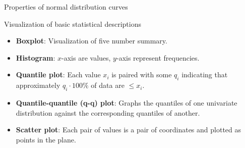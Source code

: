 \documentclass[aspectratio=169,t]{beamer}
\begin{document}
{\begin{frame}{Properties of normal distribution curves}
\begin{tikzpicture}
    \end{tikzpicture}
    \hspace{0.2cm}
    \hspace{0.2cm}
    \end{frame}
  }

{
  \begin{frame}{Visualization of basic statistical descriptions}
  \begin{itemize}
    \item \textbf{Boxplot}: Visualization of five number summary.
    \item \textbf{Histogram}: $x$-axis are values, $y$-axis represent frequencies.
    \item \textbf{Quantile plot}: Each value $x_i$ is paired with some $q_i$ indicating that approximately $q_i \cdot 100 \%$ of data are $\leq x_i$.
    \item \textbf{Quantile-quantile (q-q) plot}: Graphs the quantiles of one univariate distribution against the corresponding quantiles of another.
    \item \textbf{Scatter plot}: Each pair of values is a pair of coordinates and plotted as points in the plane.
  \end{itemize}
  \end{frame}
}
\end{document}
